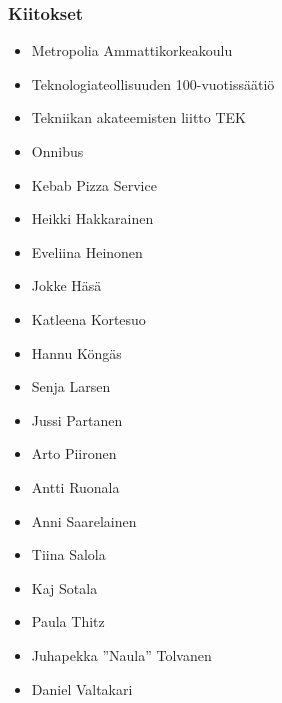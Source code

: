 \subsubsection*{Kiitokset}
\begin{itemize}
\item Metropolia Ammattikorkeakoulu %
\item Teknologiateollisuuden 100-vuotissäätiö %
\item Tekniikan akateemisten liitto TEK
\item Onnibus
\item Kebab Pizza Service
\item Heikki Hakkarainen
\item Eveliina Heinonen
\item Jokke Häsä
\item Katleena Kortesuo
\item Hannu Köngäs
\item Senja Larsen
\item Jussi Partanen
\item Arto Piironen
\item Antti Ruonala
\item Anni Saarelainen
\item Tiina Salola
\item Kaj Sotala
\item Paula Thitz
\item Juhapekka ''Naula'' Tolvanen
\item Daniel Valtakari
\end{itemize}
